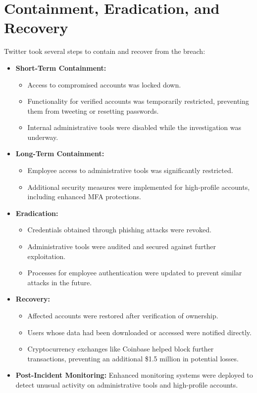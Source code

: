 \documentclass[11pt]{book}
\begin{document}
\section{Containment, Eradication, and Recovery}
Twitter took several steps to contain and recover from the breach:
\begin{itemize}
    \item \textbf{Short-Term Containment:}
    \begin{itemize}
        \item Access to compromised accounts was locked down.
        \item Functionality for verified accounts was temporarily restricted, preventing them from tweeting or resetting passwords.
        \item Internal administrative tools were disabled while the investigation was underway.
    \end{itemize}
    \item \textbf{Long-Term Containment:}
    \begin{itemize}
        \item Employee access to administrative tools was significantly restricted.
        \item Additional security measures were implemented for high-profile accounts, including enhanced MFA protections.
    \end{itemize}
    \item \textbf{Eradication:}
    \begin{itemize}
        \item Credentials obtained through phishing attacks were revoked.
        \item Administrative tools were audited and secured against further exploitation.
        \item Processes for employee authentication were updated to prevent similar attacks in the future.
    \end{itemize}
    \item \textbf{Recovery:}
    \begin{itemize}
        \item Affected accounts were restored after verification of ownership.
        \item Users whose data had been downloaded or accessed were notified directly.
        \item Cryptocurrency exchanges like Coinbase helped block further transactions, preventing an additional \$1.5 million in potential losses.
    \end{itemize}
    \item \textbf{Post-Incident Monitoring:} Enhanced monitoring systems were deployed to detect unusual activity on administrative tools and high-profile accounts.
\end{itemize}
\end{document}
